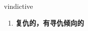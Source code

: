 
\begin{frame}
{\huge vindictive}
\begin{center}
\begin{enumerate}\Large
  \item \textbf{复仇的，有寻仇倾向的}
\end{enumerate}
\end{center}
\end{frame}
